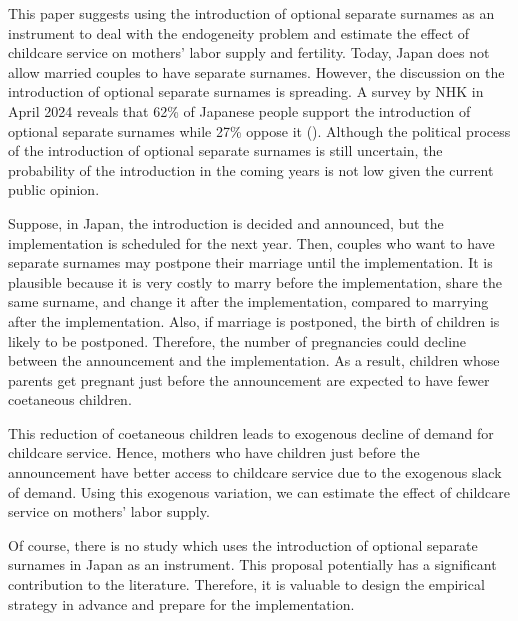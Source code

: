 \documentclass[12pt]{article}
\begin{document}
This paper suggests using the introduction of optional separate surnames as an instrument to deal with the endogeneity problem and estimate the effect of childcare service on mothers' labor supply and fertility.
Today, Japan does not allow married couples to have separate surnames.
However, the discussion on the introduction of optional separate surnames is spreading.
A survey by NHK in April 2024 reveals that 62\% of Japanese people support the introduction of optional separate surnames while 27\% oppose it (\cite{nhk}).
Although the political process of the introduction of optional separate surnames is still uncertain, the probability of the introduction in the coming years is not low given the current public opinion.


Suppose, in Japan, the introduction is decided and announced, but the implementation is scheduled for the next year.
Then, couples who want to have separate surnames may postpone their marriage until the implementation. 
It is plausible because it is very costly to marry before the implementation, share the same surname, and change it after the implementation, compared to marrying after the implementation.
Also, if marriage is postponed, the birth of children is likely to be postponed.
Therefore, the number of pregnancies could decline between the announcement and the implementation.
As a result, children whose parents get pregnant just before the announcement are expected to have fewer coetaneous children.


This reduction of coetaneous children leads to exogenous decline of demand for childcare service.
Hence, mothers who have children just before the announcement have better access to childcare service due to the exogenous slack of demand.
Using this exogenous variation, we can estimate the effect of childcare service on mothers' labor supply. 


Of course, there is no study which uses the introduction of optional separate surnames in Japan as an instrument.
This proposal potentially has a significant contribution to the literature.
Therefore, it is valuable to design the empirical strategy in advance and prepare for the implementation.
\end{document}
